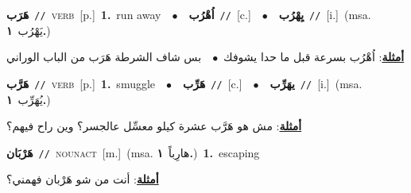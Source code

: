 \documentclass[10pt,a4paper,twoside]{article} %
\begin{document}
\begin{multicols}{2}
{\setlength\topsep{0pt}\textbf{\foreignlanguage{arabic}{هَرَب}}\ {\color{gray}\texttt{//}\color{black}}\ \textsc{verb}\ [p.]\ \textbf{1.}~run away\ \ $\bullet$\ \ \setlength\topsep{0pt}\textbf{\foreignlanguage{arabic}{اُهْرُب}}\ {\color{gray}\texttt{//}\color{black}}\ [c.]\ \ $\bullet$\ \ \setlength\topsep{0pt}\textbf{\foreignlanguage{arabic}{يِهْرُب}}\ {\color{gray}\texttt{//}\color{black}}\ [i.]\ \color{gray}(msa. \foreignlanguage{arabic}{يَهْرُب}~\foreignlanguage{arabic}{\textbf{١.}})\color{black}\  \begin{flushright}\color{gray}\foreignlanguage{arabic}{\textbf{\underline{\foreignlanguage{arabic}{أمثلة}}}: اُهْرُب بسرعة قبل ما حدا يشوفك\ $\bullet$\ \  بس شاف الشرطة هَرَب من الباب الوراني}\end{flushright}\color{black}} \vspace{2mm}

{\setlength\topsep{0pt}\textbf{\foreignlanguage{arabic}{هَرَّب}}\ {\color{gray}\texttt{//}\color{black}}\ \textsc{verb}\ [p.]\ \textbf{1.}~smuggle\ \ $\bullet$\ \ \setlength\topsep{0pt}\textbf{\foreignlanguage{arabic}{هَرِّب}}\ {\color{gray}\texttt{//}\color{black}}\ [c.]\ \ $\bullet$\ \ \setlength\topsep{0pt}\textbf{\foreignlanguage{arabic}{يهَرِّب}}\ {\color{gray}\texttt{//}\color{black}}\ [i.]\ \color{gray}(msa. \foreignlanguage{arabic}{يُهَرِّب}~\foreignlanguage{arabic}{\textbf{١.}})\color{black}\  \begin{flushright}\color{gray}\foreignlanguage{arabic}{\textbf{\underline{\foreignlanguage{arabic}{أمثلة}}}: مش هو هَرَّب عشرة كيلو معسِّل عالجسر؟ وين راح فيهم؟}\end{flushright}\color{black}} \vspace{2mm}

{\setlength\topsep{0pt}\textbf{\foreignlanguage{arabic}{هَرْبَان}}\ {\color{gray}\texttt{//}\color{black}}\ \textsc{noun\textunderscore act}\ [m.]\ \color{gray}(msa. \foreignlanguage{arabic}{هارِباً}~\foreignlanguage{arabic}{\textbf{١.}})\color{black}\ \textbf{1.}~escaping\  \begin{flushright}\color{gray}\foreignlanguage{arabic}{\textbf{\underline{\foreignlanguage{arabic}{أمثلة}}}: أنت من شو هَرْبان فهمني؟}\end{flushright}\color{black}} \vspace{2mm}


\end{multicols}
\end{document}
